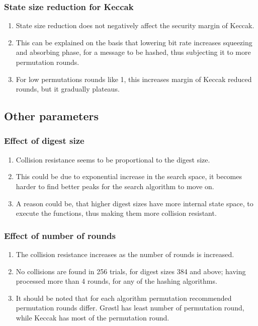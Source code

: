 \documentclass{beamer}
\begin{document}
\begin{frame}
\frametitle{State size reduction for Keccak}
\begin{enumerate}
\item State size reduction does not negatively affect the security margin of Keccak.
\item This can be explained on the basis that lowering bit rate increases squeezing and absorbing phase, for 
a message to be hashed, thus subjecting it to more permutation rounds.
\item For low permutations rounds like 1, this increases margin of Keccak reduced rounds, but it gradually 
plateaus.
\end{enumerate}
\end{frame}

\subsection{Other parameters}

\begin{frame}
\frametitle{Effect of digest size}
\begin{enumerate}
\item Collision resistance seems to be proportional to the digest size.
\item This could be due to exponential increase in the search space, it becomes harder to find better peaks
for the search algorithm to move on.
\item A reason could be, that higher digest sizes have more internal state space, to execute the functions,
thus making them more collision resistant.
\end{enumerate}
\end{frame}

\begin{frame}
\frametitle{Effect of number of rounds}
\begin{enumerate}
\item The collision resistance increases as the number of rounds is increased.
\item No collisions are found in 256 trials, for digest sizes 384 and above; having processed more than 4
rounds, for any of the hashing algorithms.
\item It should be noted that for each algorithm permutation recommended permutation rounds differ. Gr{\o}stl
has least number of permutation round, while Keccak has most of the permutation round.
\end{enumerate}
\end{frame}
\end{document}
